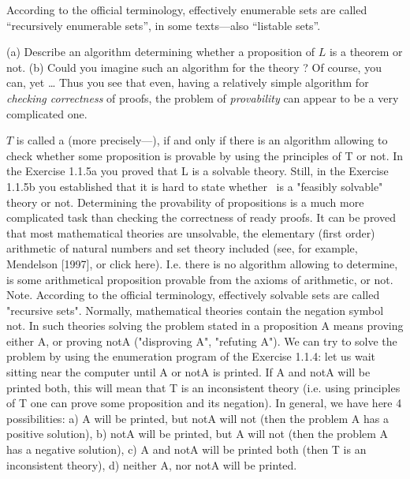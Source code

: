 \begin{note}
According to the official terminology, effectively enumerable sets are called ``recursively enumerable sets'', in some texts---also ``listable sets''.
\end{note}

\begin{exercise}
(a) Describe an algorithm determining whether a proposition of \(L\) is a theorem or not.
(b) Could you imagine such an algorithm for the theory \CHESS?
Of course, you can, yet \ldots
Thus you see that even, having a relatively simple algorithm for \emph{checking correctness} of proofs, the problem of \emph{provability} can appear to be a very complicated one.
\end{exercise}

\(T\) is called a  (more precisely---), if and only if there is an algorithm allowing to check whether some proposition is provable by using the principles of T or not. In the
Exercise 1.1.5a you proved that L is a solvable theory. Still, in the Exercise 1.1.5b you established that it
is hard to state whether \CHESS\ is a "feasibly solvable" theory or not. Determining the provability of
propositions is a much more complicated task than checking the correctness of ready proofs. It can
be proved that most mathematical theories are unsolvable, the elementary (first order) arithmetic of
natural numbers and set theory included (see, for example, Mendelson [1997], or click here). I.e. there is
no algorithm allowing to determine, is some arithmetical proposition provable from the axioms of
arithmetic, or not.
Note. According to the official terminology, effectively solvable sets are called "recursive sets".
Normally, mathematical theories contain the negation symbol not. In such theories solving the problem
stated in a proposition A means proving either A, or proving notA ("disproving A", "refuting A"). We can
try to solve the problem by using the enumeration program of the Exercise 1.1.4: let us wait sitting near
the computer until A or notA is printed. If A and notA will be printed both, this will mean that T is an
inconsistent theory (i.e. using principles of T one can prove some proposition and its negation). In
general, we have here 4 possibilities:
a) A will be printed, but notA will not (then the problem A has a positive solution),
b) notA will be printed, but A will not (then the problem A has a negative solution),
c) A and notA will be printed both (then T is an inconsistent theory),
d) neither A, nor notA will be printed.
